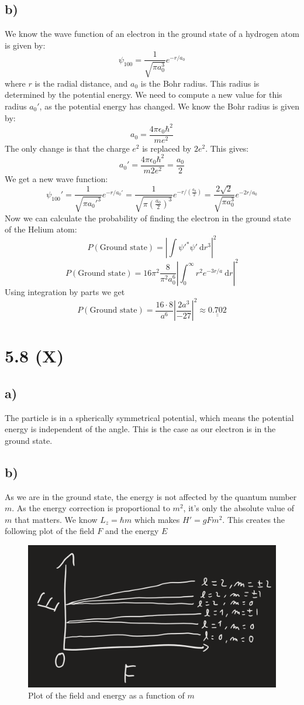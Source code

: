 \documentclass{article}
\begin{document}
\subsection*{b)}
We know the wave function of an electron in the ground state of a hydrogen atom is given by:
\[
ψ_{100} = \frac{1}{\sqrt{π a_0^3}} e^{-r / a_0}
\]
where $r$ is the radial distance, and $a_0$ is the Bohr radius. This radius is determined by the potential energy. We need to compute a new value for this radius $a_0'$, as the potential energy has changed. We know the Bohr radius is given by: 
\[
a_0 = \frac{4πϵ_0 ℏ^2}{m e^2}
\]
The only change is that the charge $e^2$ is replaced by $2e^2$. This gives:
\[
a_0' = \frac{4πϵ_0 ℏ^2}{m 2e^2} = \frac{a_0}{2}
\]
We get a new wave function:
\[
ψ_{100}' = \frac{1}{\sqrt{π a_0'^3}} e^{-r / a_0'} = \frac{1}{\sqrt{π \left(\frac{a_0}{2}\right)^3}} e^{-r / \left(\frac{a_0}{2}\right)} = \frac{2\sqrt{2}}{\sqrt{π a_0^3}} e^{-2r / a_0}
\]
Now we can calculate the probability of finding the electron in the ground state of the Helium atom:
\[
P(\text{Ground state}) = \left|∫ ψ'^{*} ψ' \ \mathrm{d}r^3\right|^2
\]
\[
P(\text{Ground state}) =  16π^2 \frac{8}{π^2a_0^6} \left|∫_{0}^{∞} r^2 e^{-3r / a} \ \mathrm{d}r\right|^2
\]
Using integration by parts we get 
\[
P(\text{Ground state}) =  \frac{16 ⋅ 8}{a^{6}} \left| \frac{2a^3}{-27} \right|^2 ≈ \underline{\underline{0.702}}
\]

\section*{5.8 (X)}
\subsection*{a)}
The particle is in a spherically symmetrical potential, which means the potential energy is independent of the angle. This is the case as our electron is in the ground state. 

\subsection*{b)}
As we are in the ground state, the energy is not affected by the quantum number $m$. As the energy correction is proportional to $m^2$, it's only the absolute value of $m$ that matters. We know $L_z = ℏm$ which makes $H' = gFm^2$. This creates the following plot of the field $F$ and the energy $E$
\begin{figure}[h!]
\centering
\includegraphics[width = .65\textwidth]{5.8.png}
\caption{Plot of the field and energy as a function of $m$}
\label{fig: 5.8b}
\end{figure}
\end{document}
